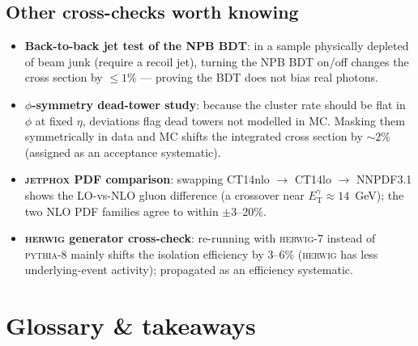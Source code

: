 \documentclass[11pt]{article}
\newcommand{\ETg}{E_{\mathrm{T}}^{\gamma}}
\begin{document}
\subsection{Other cross-checks worth knowing}
\begin{itemize}[leftmargin=1.4em]
  \item \textbf{Back-to-back jet test of the NPB BDT}: in a sample physically depleted of beam junk
  (require a recoil jet), turning the NPB BDT on/off changes the cross section by $\le1\%$ ---
  proving the BDT does not bias real photons.
  \item \textbf{$\phi$-symmetry dead-tower study}: because the cluster rate should be flat in
  $\phi$ at fixed $\eta$, deviations flag dead towers not modelled in MC. Masking them symmetrically
  in data and MC shifts the integrated cross section by $\sim2\%$ (assigned as an acceptance
  systematic).
  \item \textbf{\textsc{jetphox} PDF comparison}: swapping CT14nlo $\to$ CT14lo $\to$ NNPDF3.1
  shows the LO-vs-NLO gluon difference (a crossover near $\ETg\approx14$~GeV); the two NLO PDF
  families agree to within $\pm3$--20\%.
  \item \textbf{\textsc{herwig} generator cross-check}: re-running with \textsc{herwig}-7 instead
  of \textsc{pythia}-8 mainly shifts the isolation efficiency by 3--6\% (\textsc{herwig} has less
  underlying-event activity); propagated as an efficiency systematic.
\end{itemize}

\section{Glossary \& takeaways}
\end{document}
